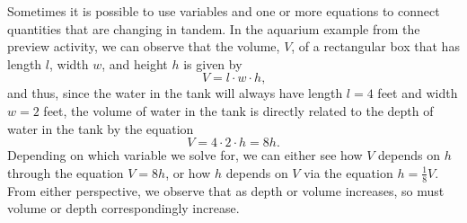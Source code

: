 \documentclass{ximera}
\begin{document}
Sometimes it is possible to use variables and one or more equations to connect quantities that are changing in tandem.  In the aquarium example from the preview activity, we can observe that the volume, \(V\), of a rectangular box that has length \(l\), width \(w\), and height \(h\) is given by%
\begin{equation*}
V = l \cdot w \cdot h\text{,}
\end{equation*}
and thus, since the water in the tank will always have length \(l = 4\) feet and width \(w = 2\) feet, the volume of water in the tank is directly related to the depth of water in the tank by the equation%
\begin{equation*}
V = 4 \cdot 2 \cdot h = 8h\text{.}
\end{equation*}
Depending on which variable we solve for, we can either see how \(V\) depends on \(h\) through the equation \(V = 8h\), or how \(h\) depends on \(V\) via the equation \(h = \frac{1}{8}V\).  From either perspective, we observe that as depth or volume increases, so must volume or depth correspondingly increase.%
\end{document}
